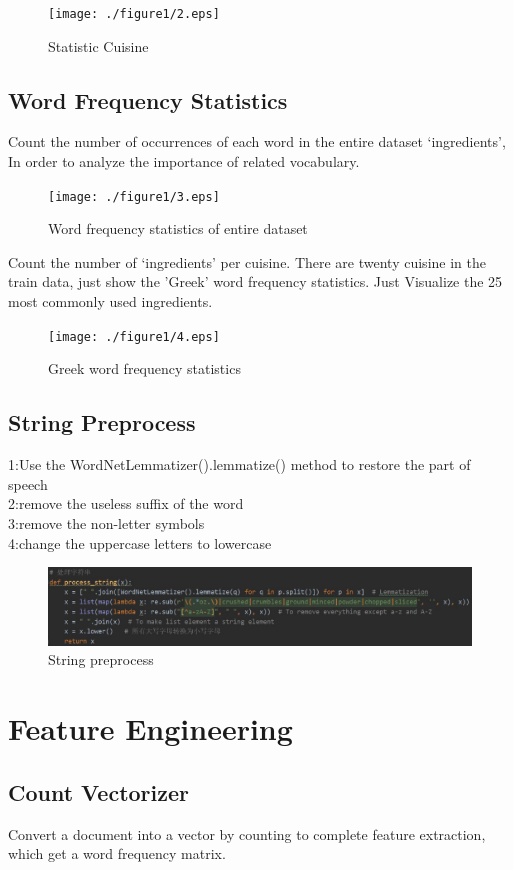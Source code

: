 \documentclass{amsart}
\begin{document}
\begin{figure}[htbp]
	\texttt{[image: ./figure1/2.eps]}
	\caption{Statistic Cuisine}
\end{figure}

\subsection{Word Frequency Statistics}
Count the number of occurrences of each word in the entire dataset ‘ingredients’, In order to analyze the importance of related vocabulary. 

\begin{figure}[htbp]
	\texttt{[image: ./figure1/3.eps]}
	\caption{Word frequency statistics of entire dataset}
\end{figure}

Count the number of ‘ingredients’ per cuisine. There are twenty cuisine in the train data, just show the 'Greek' word frequency statistics. Just Visualize the 25 most commonly used ingredients.

\begin{figure}[htbp]
	\texttt{[image: ./figure1/4.eps]}
	\caption{Greek word frequency statistics}
\end{figure}

\subsection{String Preprocess}
1:Use the WordNetLemmatizer().lemmatize() method to restore the part of speech\\
2:remove the useless suffix of the word\\
3:remove the non-letter symbols\\
4:change the uppercase letters to lowercase
\begin{figure}[htbp]
	\includegraphics[scale=0.5]{./figure1/5.eps}
	\caption{String preprocess}
\end{figure}


\section{Feature Engineering} \label{sec-method}
\subsection{Count Vectorizer}
	Convert a document into a vector by counting to complete feature extraction, which get a word frequency matrix.
\end{document}
